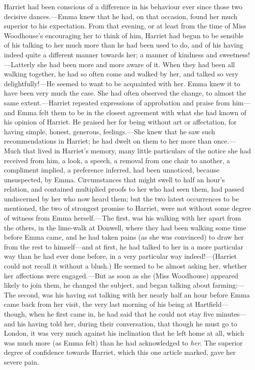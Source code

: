 Harriet had been conscious of a difference in his behaviour ever since those two decisive dances.---Emma knew that he had, on that occasion, found her much superior to his expectation. From that evening, or at least from the time of Miss Woodhouse's encouraging her to think of him, Harriet had begun to be sensible of his talking to her much more than he had been used to do, and of his having indeed quite a different manner towards her; a manner of kindness and sweetness!---Latterly she had been more and more aware of it. When they had been all walking together, he had so often come and walked by her, and talked so very delightfully!---He seemed to want to be acquainted with her. Emma knew it to have been very much the case. She had often observed the change, to almost the same extent.---Harriet repeated expressions of approbation and praise from him---and Emma felt them to be in the closest agreement with what she had known of his opinion of Harriet. He praised her for being without art or affectation, for having simple, honest, generous, feelings.---She knew that he saw such recommendations in Harriet; he had dwelt on them to her more than once.---Much that lived in Harriet's memory, many little particulars of the notice she had received from him, a look, a speech, a removal from one chair to another, a compliment implied, a preference inferred, had been unnoticed, because unsuspected, by Emma. Circumstances that might swell to half an hour's relation, and contained multiplied proofs to her who had seen them, had passed undiscerned by her who now heard them; but the two latest occurrences to be mentioned, the two of strongest promise to Harriet, were not without some degree of witness from Emma herself.---The first, was his walking with her apart from the others, in the lime-walk at Donwell, where they had been walking some time before Emma came, and he had taken pains (as she was convinced) to draw her from the rest to himself---and at first, he had talked to her in a more particular way than he had ever done before, in a very particular way indeed!---(Harriet could not recall it without a blush.) He seemed to be almost asking her, whether her affections were engaged.---But as soon as she (Miss Woodhouse) appeared likely to join them, he changed the subject, and began talking about farming:---The second, was his having sat talking with her nearly half an hour before Emma came back from her visit, the very last morning of his being at Hartfield---though, when he first came in, he had said that he could not stay five minutes---and his having told her, during their conversation, that though he must go to London, it was very much against his inclination that he left home at all, which was much more (as Emma felt) than he had acknowledged to {\em her}. The superior degree of confidence towards Harriet, which this one article marked, gave her severe pain.

